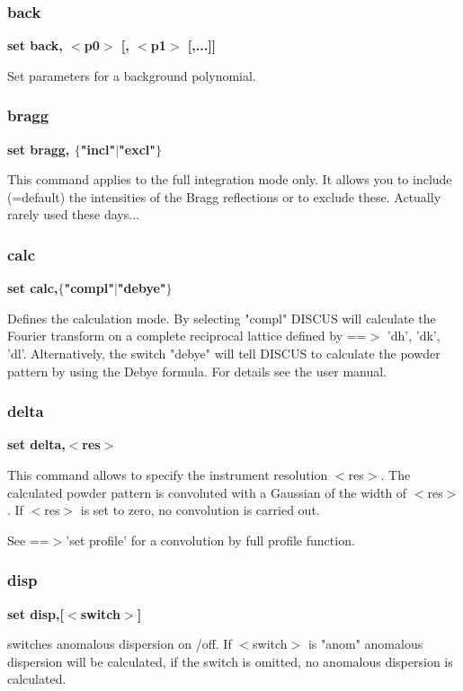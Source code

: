 \subsubsection{back}
{\bf set back, $ <$p0$> $ [, $ <$p1$> $ [,...]] \par }
\par
\vspace{3pt}
Set parameters for a background polynomial. 
\subsubsection{bragg}
{\bf set bragg, $ \{$"incl"$| $"excl"$\} $ \par }
\par
\vspace{3pt}
This command applies to the full integration mode only. It 
allows you to include (=default) the intensities of the Bragg 
reflections or to exclude these. 
Actually rarely used these days... 
\subsubsection{calc}
{\bf set calc,$ \{$"compl"$| $"debye"$\} $ \par }
\par
\vspace{3pt}
Defines the calculation mode. By selecting "compl" DISCUS will 
calculate the Fourier transform on a complete reciprocal lattice 
defined by ==$> $ 'dh', 'dk', 'dl'. Alternatively, the switch "debye" 
will tell DISCUS to calculate the powder pattern by using the 
Debye formula. For details see the user manual. 
\subsubsection{delta}
{\bf set delta,$ <$res$> $ \par }
\par
\vspace{3pt}
This command allows to specify the instrument resolution $ <$res$> $. The 
calculated powder pattern is convoluted with a Gaussian of the width 
of $ <$res$> $. If $ <$res$> $ is set to zero, no convolution is carried out. 
\par
See ==$> $'set profile' for a convolution by full profile function. 
\subsubsection{disp}
{\bf set disp,[$ <$switch$> $] \par }
\par
\vspace{3pt}
switches anomalous dispersion on /off. If $ <$switch$> $ is "anom" anomalous 
dispersion will be calculated, if the switch is omitted, no anomalous 
dispersion is calculated. 

